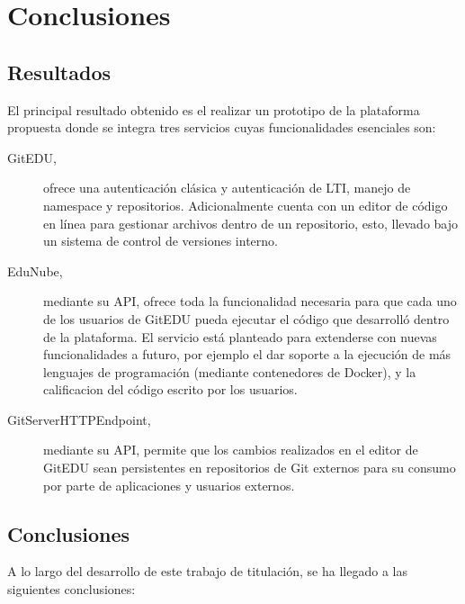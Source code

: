 
\chapter{Conclusiones}
\label{capitulo7}

\section{Resultados}
El principal resultado obtenido es el realizar un prototipo de la plataforma propuesta donde se integra tres servicios cuyas funcionalidades esenciales son:
\begin{description}
	\item[GitEDU,] ofrece una autenticación clásica y autenticación de LTI, manejo de namespace y repositorios. Adicionalmente cuenta con un editor de código en línea para gestionar archivos dentro de un repositorio, esto, llevado bajo un sistema de control de versiones interno.
    \item[EduNube,] mediante su API, ofrece toda la funcionalidad necesaria para que cada uno de los usuarios de GitEDU pueda ejecutar el código que desarrolló dentro de la plataforma. El servicio está planteado para extenderse con nuevas funcionalidades a futuro, por ejemplo el dar soporte a la ejecución de más lenguajes de programación (mediante contenedores de Docker), y la calificacion del código escrito por los usuarios.
    \item[GitServerHTTPEndpoint,] mediante su API, permite que los cambios realizados en el editor de GitEDU sean persistentes en repositorios de Git externos para su consumo por parte de aplicaciones y usuarios externos.
\end{description}


\section{Conclusiones}
A lo largo del desarrollo de este trabajo de titulación, se ha llegado a las siguientes conclusiones:

